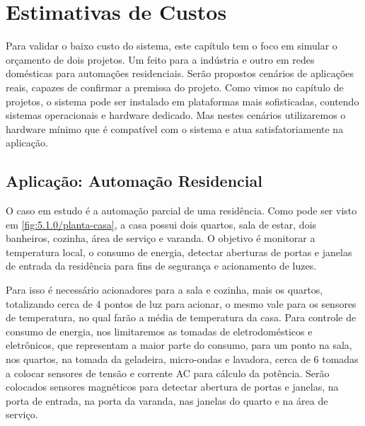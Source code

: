 \chapter{Estimativas de Custos}
\label{chapter:estimativa}

Para validar o baixo custo do sistema, este capítulo tem o foco em simular o orçamento de dois projetos. Um feito para a indústria e outro em redes domésticas para automações residenciais. Serão propostos cenários de aplicações reais, capazes de confirmar a premissa do projeto.
Como vimos no capítulo de projetos, o sistema pode ser instalado em plataformas mais sofisticadas, contendo sistemas operacionais e hardware dedicado. Mas nestes cenários utilizaremos o hardware mínimo que é compatível com o sistema e atua satisfatoriamente na aplicação.


\section{Aplicação: Automação Residencial}
\label{section:residencial}

O caso em estudo é a automação parcial de uma residência. Como pode ser visto em  \ref{fig:5.1.0/planta-casa}, a casa possui dois quartos, sala de estar, dois banheiros, cozinha, área de serviço e varanda. O objetivo é monitorar a temperatura local, o consumo de energia, detectar aberturas de portas e janelas de entrada da residência para fins de segurança e acionamento de luzes.

Para isso é necessário acionadores para a sala e cozinha, mais os quartos, totalizando cerca de 4 pontos de luz para acionar, o mesmo vale para os sensores de temperatura, no qual farão a média de temperatura da casa. Para controle de consumo de energia, nos limitaremos as tomadas de eletrodomésticos e eletrônicos, que representam a maior parte do consumo, para um ponto na sala, nos quartos, na tomada da geladeira, micro-ondas e lavadora, cerca de 6 tomadas a colocar sensores de tensão e corrente AC para cálculo da potência. Serão colocados sensores magnéticos para detectar abertura de portas e janelas, na porta de entrada, na porta da varanda, nas janelas do quarto e na área de serviço.

